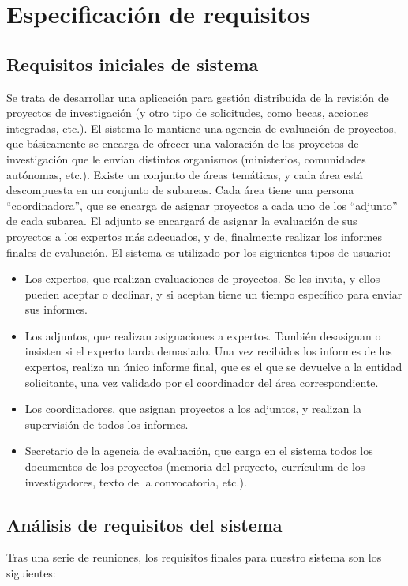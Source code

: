 \documentclass[12pt,a4paper,spanish,twoside]{article}
\begin{document}
\section{Especificación de requisitos}
\subsection{Requisitos iniciales de sistema}
Se trata de desarrollar una aplicación para gestión distribuída de la
revisión de proyectos de investigación (y otro tipo de solicitudes, como
becas, acciones integradas, etc.). El sistema lo mantiene una agencia de
evaluación de proyectos, que básicamente se encarga de ofrecer una valoración
de los proyectos de investigación que le envían distintos organismos
(ministerios, comunidades autónomas, etc.). Existe un conjunto de áreas
temáticas, y cada área está descompuesta en un conjunto de subareas. Cada
área tiene una persona ``coordinadora'', que se encarga de asignar proyectos
a cada uno de los ``adjunto'' de cada subarea. El adjunto se encargará de
asignar la evaluación de sus proyectos a los expertos más adecuados, y de,
finalmente realizar los informes finales de evaluación. El sistema es
utilizado por los siguientes tipos de usuario: 

\begin{itemize}
\item Los expertos, que realizan evaluaciones de proyectos. Se les invita, y
  ellos pueden aceptar o declinar, y si aceptan tiene un tiempo específico
  para enviar sus informes. 
\item Los adjuntos, que realizan asignaciones a expertos. También desasignan
  o insisten si el experto tarda demasiado. Una vez recibidos los informes de
  los expertos, realiza un único informe final, que es el que se devuelve a
  la entidad solicitante, una vez validado por el coordinador del área
  correspondiente. 
\item Los coordinadores, que asignan proyectos a los adjuntos, y realizan la
  supervisión de todos los informes.
\item Secretario de la agencia de evaluación, que carga en el sistema todos
  los documentos de los proyectos (memoria del proyecto, currículum de los
  investigadores, texto de la convocatoria, etc.). 
\end{itemize}

\subsection{Análisis de requisitos del sistema}
Tras una serie de reuniones, los requisitos finales para nuestro sistema son
los siguientes: 
\end{document}
